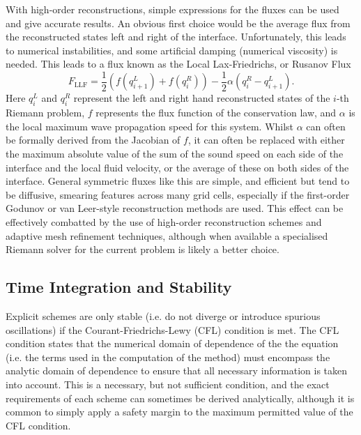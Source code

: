 With high-order reconstructions, simple expressions for the fluxes can be used and give accurate results.
An obvious first choice would be the average flux from the reconstructed states left and right of the interface.
Unfortunately, this leads to numerical instabilities, and some artificial damping (numerical viscosity) is needed.
This leads to a flux known as the Local Lax-Friedrichs, or Rusanov Flux \citep{Rusanov1962}
\begin{equation}
    F_{\mathrm{LLF}} = \frac{1}{2}(f(q_{i+1}^L) + f(q_i^R)) - \frac{1}{2}\alpha(q_i^R - q_{i+1}^L).
\end{equation}
Here $q_i^L$ and $q_i^R$ represent the left and right hand reconstructed states of the $i$-th Riemann problem, $f$ represents the flux function of the conservation law, and $\alpha$ is the local maximum wave propagation speed for this system.
Whilst $\alpha$ can often be formally derived from the Jacobian of $f$, it can often be replaced with either the maximum absolute value of the sum of the sound speed on each side of the interface and the local fluid velocity, or the average of these on both sides of the interface.
General symmetric fluxes like this are simple, and efficient but tend to be diffusive, smearing features across many grid cells, especially if the first-order Godunov or van Leer-style reconstruction methods are used.
This effect can be effectively combatted by the use of high-order reconstruction schemes and adaptive mesh refinement techniques, although when available a specialised Riemann solver for the current problem is likely a better choice.

\subsection{Time Integration and Stability}\label{Sec:HydroStability}

Explicit schemes are only stable (i.e. do not diverge or introduce spurious oscillations) if the Courant-Friedrichs-Lewy (CFL) condition is met.
The CFL condition states that the numerical domain of dependence of the the equation (i.e. the terms used in the computation of the method) must encompass the analytic domain of dependence to ensure that all necessary information is taken into account.
This is a necessary, but not sufficient condition, and the exact requirements of each scheme can sometimes be derived analytically, although it is common to simply apply a safety margin to the maximum permitted value of the CFL condition.

